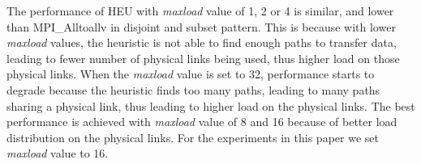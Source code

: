 The performance of HEU with \textit{maxload} value of 1, 2 or 4 is similar, and lower than MPI\_Alltoallv in disjoint and subset pattern. This is because with lower \textit{maxload} values, the heuristic is not able to find enough paths to transfer data, leading to fewer number of physical links being used, thus higher load on those physical links. When the \textit{maxload} value is set to 32, performance starts to degrade because 
the heuristic finds too many paths, leading to many paths sharing a physical link, thus leading to higher load on the physical links. The best performance is achieved with \textit{maxload} value of 8 and 16 because of better load distribution on the physical links. For the experiments in this paper we set \textit{maxload} value to 16.
\begin{comment}
When we increase the \textit{maxload} value, it also takes more time to select paths from the $k$ shortest paths. Table \ref{table:solvetime} shows the time for different \textit{maxload} values in different patterns.
\begin{table}[!htbp]
   \centering
   \begin{tabular}{| p {0.75cm}| r | r | r | r | r | r |}
    \hline
    \multirow{2}{*}{Pattern} & \multicolumn{6}{ c| }{Time for Different Max Load (s)} \\ \cline{2-7}
    & 1 & 2 & 4 & 8 & 16 & 32 \\ \hline
    Disjoint & 1.958 & 1.961 & 1.917 & 1.956 & 2.002 &  2.164 \\ \hline
    Overlap & 1.923 & 1.890 & 1.801 & 1.929 & 1.993 & 2.082 \\ \hline
    Subset & 1.907 & 1.870 & 1.891 & 1.955 & 2.024 &  2.223 \\ \hline
    \end{tabular}
    \caption{Search time with different max load in 1024 nodes partition.}
    \label{table:solvetime}
\end{table}

The search time is short and thus can be amortized over time when a pattern is used repeatedly.
\end{comment}
